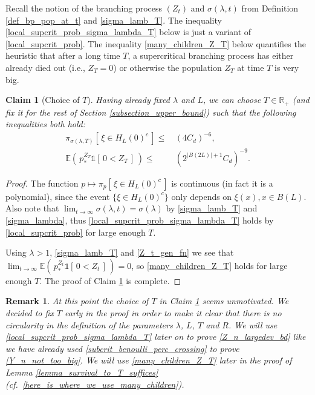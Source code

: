 \documentclass[a4paper,12pt]{article}
\newtheorem  {remark}        [theorem]{Remark}
\newtheorem  {claim}        [theorem]{Claim}
\begin{document}
Recall the notion of the branching process $(Z_t)$ and $\sigma(\lambda,t)$ from Definition \ref{def_bp_pop_at_t} and \eqref{sigma_lamb_T}. The inequality \eqref{local_supcrit_prob_sigma_lambda_T}
below is just a variant of \eqref{local_supcrit_prob}.
 The inequality \eqref{many_children_Z_T} below
quantifies the heuristic that after a long time $T$, a supercritical branching process has either already died out (i.e., $Z_T=0$) or otherwise the population $Z_T$ at time $T$  is very big.
\begin{claim}[Choice of $T$] \label{claim_supcrit_T_choice}
 Having already fixed $\lambda$ and $L$,  we can choose  $T \in \mathbb{R_+}$ (and fix it for the rest of Section \ref{subsection_upper_bound}) such that the following inequalities both hold:
\begin{align}
\label{local_supcrit_prob_sigma_lambda_T}
\pi_{\sigma(\lambda,T)}\left[ \, \xi \in H_L(0)^c \, \right] \leq & \, (4 C_d)^{-6},
   \\
\label{many_children_Z_T}
  \mathbb{E}\left( \, p_*^{Z_T} \mathds{1}[ \, 0 < Z_T \, ] \, \right) \leq & \, \left( 2^{|B(2L)|+1} C_d \right)^{-9}.
\end{align}
\end{claim}
\begin{proof} The function $p \mapsto \pi_{p}\left[ \, \xi \in H_L(0)^c \, \right]$ is continuous (in fact it is a polynomial), since the event $\{\xi \in H_L(0)^c \}$ only depends on
$\xi(x), x \in B(L)$. Also note that $\lim_{t \to \infty}\sigma(\lambda,t)=\sigma(\lambda)$ by \eqref{sigma_lamb_T} and \eqref{sigma_lambda}, thus \eqref{local_supcrit_prob_sigma_lambda_T} holds by \eqref{local_supcrit_prob} for large enough $T$.

\smallskip

Using $\lambda>1$, \eqref{sigma_lamb_T} and \eqref{Z_t_gen_fn} we see that $\lim_{t \to \infty }  \mathbb{E}\left( \, p_*^{Z_t} \mathds{1}[ \, 0 < Z_t \, ] \, \right) =0$,
so \eqref{many_children_Z_T} holds for large enough $T$. The proof of Claim \ref{claim_supcrit_T_choice} is complete.
\end{proof}

\begin{remark} At this point the choice of $T$ in Claim \ref{claim_supcrit_T_choice} seems unmotivated. We decided to fix $T$ early in the proof in order to
make it clear that there is no circularity in the definition of the parameters $\lambda$, $L$, $T$ and $R$.
We will use \eqref{local_supcrit_prob_sigma_lambda_T} later on to prove \eqref{Z_n_largedev_bd}
like we have already used \eqref{subcrit_benoulli_perc_crossing} to prove \eqref{Y_n_not_too_big}.
We will use \eqref{many_children_Z_T} later in the proof of Lemma \ref{lemma_survival_to_T_suffices} (cf.\ \eqref{here_is_where_we_use_many_children}).
\end{remark}
\end{document}

